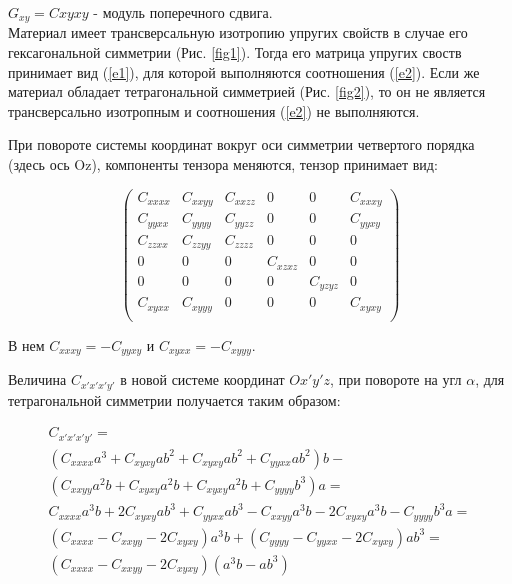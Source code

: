 \documentclass[a4paper,12pt]{article}
\begin{document}
$G_{xy} = C{xyxy}$ - модуль поперечного сдвига.\\

Материал имеет трансверсальную изотропию упругих свойств в случае его гексагональной симметрии (Рис. \ref{fig1}). 
Тогда его матрица упругих своств принимает вид (\ref{e1}), для которой выполняются соотношения (\ref{e2}). 
Если же материал обладает тетрагональной симметрией (Рис. \ref{fig2}), то он не является трансверсально изотропным 
и соотношения (\ref{e2}) не выполняются.

При повороте системы координат вокруг оси симметрии четвертого порядка (здесь ось Oz), 
компоненты тензора меняются, тензор принимает вид: 

\begin{equation} \label{e3}
\begin{pmatrix} 
C_{xxxx} & C_{xxyy} & C_{xxzz} & 0 & 0 & C_{xxxy}\\
C_{yyxx} & C_{yyyy} & C_{yyzz} & 0 & 0 & C_{yyxy}\\
C_{zzxx} & C_{zzyy} & C_{zzzz} & 0 & 0 & 0\\
0 & 0 & 0 & C_{xzxz} & 0 & 0 \\
0 & 0 & 0 & 0 & C_{yzyz} & 0 \\
C_{xyxx} & C_{xyyy} & 0 & 0 & 0 & C_{xyxy} \\
\end{pmatrix} 
\end{equation} 

В нем $C_{xxxy} = -C_{yyxy}$ и $C_{xyxx} = -C_{xyyy}$.

Величина $C_{x'x'x'y'}$ в новой системе координат $Ox'y'z$, при повороте на угл $\alpha$, 
для тетрагональной симметрии получается таким образом:

\begin{equation} \label{e4}
\begin{gathered}
C_{x'x'x'y'} = \\
(C_{xxxx} a^3 + C_{xyxy}  a  b^2 + C_{xyxy}  a  b^2 + C_{yyxx}  a  b^2)  b - \\
(C_{xxyy}  a^2  b + C_{xyxy}  a^2  b + C_{xyxy}  a^2 b + C_{yyyy}  b^3)  a = \\
C_{xxxx} a^3 b + 2 C_{xyxy}  a  b^3 + C_{yyxx}  a  b^3 - C_{xxyy}  a^3  b - 
2 C_{xyxy}  a^3  b - C_{yyyy}  b^3 a = \\
(C_{xxxx} - C_{xxyy} - 2 C_{xyxy}) a^3 b + (C_{yyyy} - C_{yyxx} - 2 C_{xyxy}) a b^3 = \\
(C_{xxxx} - C_{xxyy} - 2 C_{xyxy}) (a^3 b - a b^3)
\end{gathered}
\end{equation} 
\end{document}
